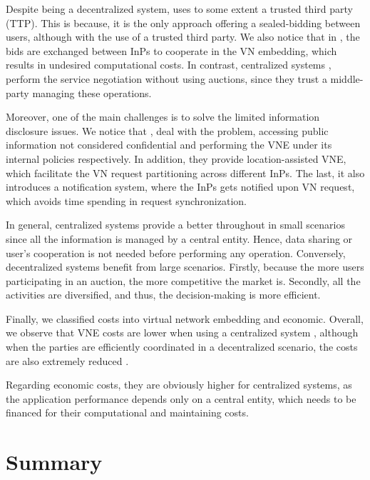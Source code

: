 Despite being a decentralized system, \cite{zaheer2010multi} uses to some extent a trusted third party (TTP). This is because, it is the only approach offering a sealed-bidding between users, although with the use of a trusted third party. We also notice that in \cite{esposito2013general}, \cite{chowdhury2010polyvine} the bids are exchanged between InPs to cooperate in the VN embedding, which results in undesired computational costs. In contrast, centralized systems \citep{dietrich2015multi}, perform the service negotiation without using auctions, since they trust a middle-party managing these operations.

Moreover, one of the main challenges is to solve the limited information disclosure issues. We notice that \citep{dietrich2015multi}, \citep{chowdhury2010polyvine} deal with the problem, accessing public information not considered confidential and performing the VNE under its internal policies respectively. In addition, they provide location-assisted VNE, which facilitate the VN request partitioning across different InPs. The last, it also introduces a notification system, where the InPs gets notified upon VN request, which avoids time spending in request synchronization. 

In general, centralized systems provide a better throughout in small scenarios since all the information is managed by a central entity. Hence, data sharing or user's cooperation is not needed before performing any operation. Conversely, decentralized systems benefit from large scenarios. Firstly, because the more users participating in an auction, the more competitive the market is. Secondly, all the activities are diversified, and thus, the decision-making is more efficient. 

Finally, we classified costs into virtual network embedding and economic. Overall, we observe that VNE costs are lower when using a centralized system \citep{dietrich2015multi}, although when the parties are efficiently coordinated in a decentralized scenario, the costs are also extremely reduced \citep{chowdhury2010polyvine}. 

Regarding economic costs, they are obviously higher for centralized systems, as the application performance depends only on a central entity, which needs to be financed for their computational and maintaining costs.



\section{Summary}

